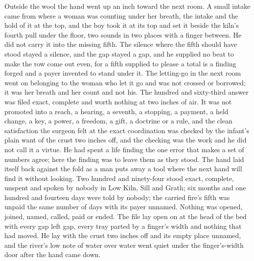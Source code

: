 Outside the wool the hand went up an inch toward the next room. A small intake came from where a woman was counting under her breath, the intake and the hold of it at the top, and the boy took it at its top and set it beside the kiln's fourth pull under the floor, two sounds in two places with a finger between. He did not carry it into the missing fifth. The silence where the fifth should have stood stayed a silence, and the gap stayed a gap, and he supplied no beat to make the row come out even, for a fifth supplied to please a total is a finding forged and a payer invented to stand under it. The letting-go in the next room went on belonging to the woman who let it go and was not crossed or borrowed; it was her breath and her count and not his. The hundred and sixty-third answer was filed exact, complete and worth nothing at two inches of air. It was not promoted into a reach, a hearing, a seventh, a stopping, a payment, a held change, a key, a power, a freedom, a gift, a doctrine or a rule, and the clean satisfaction the surgeon felt at the exact coordination was checked by the infant's plain want of the crust two inches off, and the checking was the work and he did not call it a virtue. He had spent a life finding the one error that makes a set of numbers agree; here the finding was to leave them as they stood. The hand laid itself back against the fold as a man puts away a tool where the next hand will find it without looking. Two hundred and ninety-four stood exact, complete, unspent and spoken by nobody in Low Kiln, Sill and Grath; six months and one hundred and fourteen days were told by nobody; the carried fire's fifth was unpaid the same number of days with its payer unnamed. Nothing was opened, joined, named, called, paid or ended. The file lay open on  at the head of the bed with every gap left gap, every tray parted by a finger's width and nothing that had moved. He lay with the crust two inches off and its empty place unnamed, and the river's low note of water over water went quiet under the finger's-width door after the hand came down.

